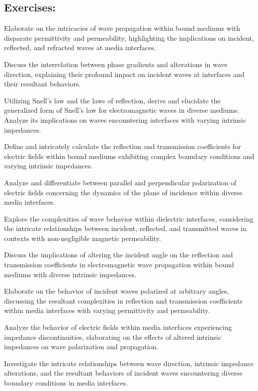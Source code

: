 \begin{mdframed}[ backgroundcolor=lightblue, linewidth=1pt, hidealllines=true]
\section{Exercises:}
\begin{ExerciseList}
\Exercise[label={ex11}]
Elaborate on the intricacies of wave propagation within bound mediums with disparate permittivity and permeability, highlighting the implications on incident, reflected, and refracted waves at media interfaces.

\Exercise[label={ex11}]
Discuss the interrelation between phase gradients and alterations in wave direction, explaining their profound impact on incident waves at interfaces and their resultant behaviors.

\Exercise[label={ex11}]
Utilizing Snell's law and the laws of reflection, derive and elucidate the generalized form of Snell's law for electromagnetic waves in diverse mediums. Analyze its implications on waves encountering interfaces with varying intrinsic impedances.

\Exercise[label={ex11}]
Define and intricately calculate the reflection and transmission coefficients for electric fields within bound mediums exhibiting complex boundary conditions and varying intrinsic impedances.

\Exercise[label={ex11}]
Analyze and differentiate between parallel and perpendicular polarization of electric fields concerning the dynamics of the plane of incidence within diverse media interfaces.

\Exercise[label={ex11}]
Explore the complexities of wave behavior within dielectric interfaces, considering the intricate relationships between incident, reflected, and transmitted waves in contexts with non-negligible magnetic permeability.

\Exercise[label={ex11}]
Discuss the implications of altering the incident angle on the reflection and transmission coefficients in electromagnetic wave propagation within bound mediums with diverse intrinsic impedances.

\Exercise[label={ex11}]
Elaborate on the behavior of incident waves polarized at arbitrary angles, discussing the resultant complexities in reflection and transmission coefficients within media interfaces with varying permittivity and permeability.

\Exercise[label={ex11}]
Analyze the behavior of electric fields within media interfaces experiencing impedance discontinuities, elaborating on the effects of altered intrinsic impedances on wave polarization and propagation.

\Exercise[label={ex11}]
Investigate the intricate relationships between wave direction, intrinsic impedance alterations, and the resultant behaviors of incident waves encountering diverse boundary conditions in media interfaces.
\end{ExerciseList}
\end{mdframed}
